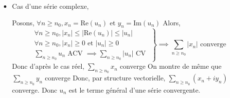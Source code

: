 \documentclass{article}
\renewenvironment{question_kholle}[2][ ]
{
	\subsection{\texorpdfstring{#2}{}}
	\notblank{#1}
	{
		\noindent #1
		\bigbreak
	}
	{}
	\begin{proof}
}
{
	\end{proof}
}
\begin{document}
\begin{question_kholle}
\begin{itemize}[label=$\lozenge$]
\begin{figure}[H]
			      \caption{Décomposition de la suite $u$ en $u^+$ et $u^-$, les "partie positive" et "partie négative". Graphiquement, on retrouve $u_n^+ + u_n^- = |u_n|$ et $u_n^+ - u_n^- = u_n$}
		      \end{figure}
		\item Cas d'une série complexe,

		      Posons, $\forall n\geqslant n_{0}, x_{n} = \mathrm{Re}(u_{n})$ et $y_{n} = \mathrm{Im}(u_{n})$
		      Alors,
		      $$
			      \left. \begin{array}{ll}
				      \forall n \geqslant n_{0}, \lvert x_{n} \rvert \leqslant \lvert \mathrm{Re}(u_{n}) \rvert \leqslant \lvert u_{n} \rvert \\
				      \forall n\geqslant n_{0}, \lvert  x_{n} \rvert \geqslant 0 \text{ et } \lvert u_{n} \rvert \geqslant 0                  \\
				      \sum_{n\geqslant n_{0}}u_{n} \text{ ACV } \implies \sum_{n\geqslant n_{0}}\lvert u_{n} \rvert \text{ CV }
			      \end{array}\right\}\implies \sum_{n\geqslant n_{0}}\lvert x_{n} \rvert \text{ converge}
		      $$
		      Donc d'après le cas réel, $\sum_{n\geqslant n_{0}} x_{n}$ converge
		      On montre de même que $\sum_{n\geqslant n_{0}}y_{n}$ converge
		      Donc, par structure vectorielle, $\sum_{n\geqslant n_{0}}(x_{n}+ iy_{n})$ converge.
		      Donc $u_{n}$ est le terme général d'une série convergente.
	\end{itemize}

\end{question_kholle}
\end{document}
